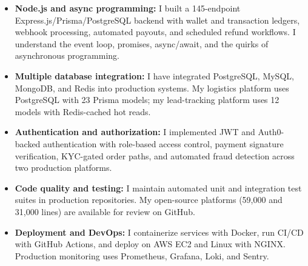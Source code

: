 \documentclass[]{cover}
\renewcommand{\closing}[1]{\raggedright\fontspec[Path = OpenFonts/fonts/raleway/]{Raleway-Medium}\fontsize{11pt}{13pt}\selectfont {#1 \\[1pt]}\mbox{}\\ \normalfont}
\renewcommand{\signature}[1]{\raggedright\fontspec[Path = OpenFonts/fonts/raleway/]{Raleway-Medium}\fontsize{11pt}{13pt}\selectfont {#1} \normalfont}
\begin{document}

\currentdate{\today}



{\raggedright{}\fontsize{11pt}{13pt}\selectfont
\renewcommand{\labelitemi}{\textbullet}
\renewcommand{\labelitemii}{\textbullet}
\renewcommand{\labelitemiii}{\textbullet}
\begin{itemize}
    \item \textbf{Node.js and async programming:} I built a 145-endpoint Express.js/Prisma/PostgreSQL backend with wallet and transaction ledgers, webhook processing, automated payouts, and scheduled refund workflows. I understand the event loop, promises, async/await, and the quirks of asynchronous programming.
    \item \textbf{Multiple database integration:} I have integrated PostgreSQL, MySQL, MongoDB, and Redis into production systems. My logistics platform uses PostgreSQL with 23 Prisma models; my lead-tracking platform uses 12 models with Redis-cached hot reads.
    \item \textbf{Authentication and authorization:} I implemented JWT and Auth0-backed authentication with role-based access control, payment signature verification, KYC-gated order paths, and automated fraud detection across two production platforms.
    \item \textbf{Code quality and testing:} I maintain automated unit and integration test suites in production repositories. My open-source platforms (59,000 and 31,000 lines) are available for review on GitHub.
    \item \textbf{Deployment and DevOps:} I containerize services with Docker, run CI/CD with GitHub Actions, and deploy on AWS EC2 and Linux with NGINX. Production monitoring uses Prometheus, Grafana, Loki, and Sentry.
\end{itemize}\par}
\vspace{6pt}


\begin{flushright}
\closing{Kind regards,}

\signature{Gaurav Chaudhary}
\end{flushright}
\end{document}
